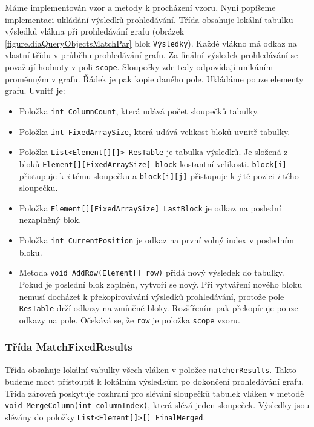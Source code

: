 Máme implementován vzor a metody k procházení vzoru.
Nyní popíšeme implementaci ukládání výsledků prohledávání.
Třída obsahuje lokální tabulku výsledků vlákna při prohledávání grafu (obrázek \ref{figure.diaQueryObjectsMatchPar} blok \texttt{Výsledky}). 
Každé vlákno má odkaz na vlastní třídu v průběhu prohledávání grafu.
Za finální výsledek prohledávání se považují hodnoty v poli \texttt{scope}.
Sloupečky zde tedy odpovídají unikáním proměnným v grafu.
Řádek je pak kopie daného pole.
Ukládáme pouze elementy grafu.
Uvnitř je:
\begin{itemize}
\item Položka \texttt{int ColumnCount}, která udává počet sloupečků tabulky. 
\item Položka \texttt{int FixedArraySize}, která udává velikost bloků uvnitř tabulky.
\item Položka \texttt{List<Element[][]> ResTable} je tabulka výsledků. 
Je složená z bloků \texttt{Element[][FixedArraySize] block} kostantní velikosti.
\texttt{block[i]} přistupuje k \textit{i}-tému sloupečku a \texttt{block[i][j]} přistupuje k \textit{j}-té pozici \textit{i}-tého sloupečku.
\item Položka \texttt{Element[][FixedArraySize] LastBlock} je odkaz na poslední nezaplněný blok.
\item Položka \texttt{int CurrentPosition} je odkaz na první volný index v posledním bloku.
\item Metoda \texttt{void AddRow(Element[] row)} přidá nový výsledek do tabulky.
Pokud je poslední blok zaplněn, vytvoří se nový.
Při vytváření nového bloku nemusí docházet k překopírovávání výsledků prohledávání, protože pole \texttt{ResTable} drží odkazy na zmíněné bloky.
Rozšířením pak překopíruje pouze odkazy na pole.
Očekává se, že \texttt{row} je položka \texttt{scope} vzoru. 

\end{itemize}

\subsubsection{Třída MatchFixedResults}

Třída obsahuje lokální vabulky všech vláken v položce \texttt{matcherResults}.
Takto budeme moct přistoupit k lokálním výsledkům po dokončení prohledávání grafu.
Třída zároveň poskytuje rozhraní pro slévání sloupečků tabulek vláken v metodě \texttt{void MergeColumn(int columnIndex)}, která slévá jeden sloupeček.
Výsledky jsou slévány do položky \texttt{List<Element[]>[] FinalMerged}.

